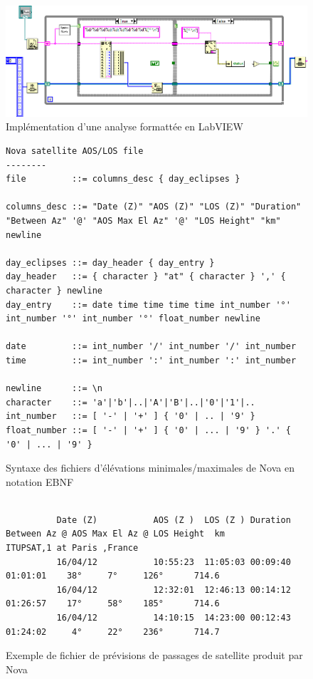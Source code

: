 \documentclass[twocolumn,pre,floats,aps,amsmath,amssymb]{revtex4}
\begin{document}
\begin{figure}[]
  \includegraphics[width=17cm]{parser_nova_labview.png}
\caption{Impl\'ementation d'une analyse formatt\'ee en LabVIEW}
\label{fig:algo_scan_parse_nova_labview}
\end{figure}

\begin{figure}
\begin{verbatim}
Nova satellite AOS/LOS file
--------
file         ::= columns_desc { day_eclipses }

columns_desc ::= "Date (Z)" "AOS (Z)" "LOS (Z)" "Duration" "Between Az" '@' "AOS Max El Az" '@' "LOS Height" "km" newline

day_eclipses ::= day_header { day_entry }
day_header   ::= { character } "at" { character } ',' { character } newline
day_entry    ::= date time time time time int_number '°' int_number '°' int_number '°' float_number newline

date         ::= int_number '/' int_number '/' int_number
time         ::= int_number ':' int_number ':' int_number

newline      ::= \n
character    ::= 'a'|'b'|..|'A'|'B'|..|'0'|'1'|..
int_number   ::= [ '-' | '+' ] { '0' | .. | '9' }
float_number ::= [ '-' | '+' ] { '0' | ... | '9' } '.' { '0' | ... | '9' }
\end{verbatim}
\caption{Syntaxe des fichiers d'\'el\'evations minimales/maximales de Nova en notation EBNF}
\label{fig:EBNF_Nova}
\end{figure}

\begin{figure}
{\scriptsize
\begin{verbatim}

          Date (Z)           AOS (Z )  LOS (Z ) Duration  Between Az @ AOS Max El Az @ LOS Height  km 
ITUPSAT,1 at Paris ,France                                                                            
          16/04/12           10:55:23  11:05:03 00:09:40 01:01:01    38°     7°     126°      714.6   
          16/04/12           12:32:01  12:46:13 00:14:12 01:26:57    17°     58°    185°      714.6   
          16/04/12           14:10:15  14:23:00 00:12:43 01:24:02     4°     22°    236°      714.7   

\end{verbatim}
}
\caption{Exemple de fichier de pr\'evisions de passages de satellite produit par Nova}
\label{fig:EBNF_Nova2}
\end{figure}
\end{document}
